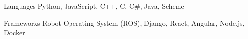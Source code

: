 
\begin{cvskills}
  \cvskill
    {Languages} %
    {Python, JavaScript, C++, C, C\#, Java, Scheme} %

  \cvskill
    {Frameworks} %
    {Robot Operating System (ROS), Django, React, Angular, Node.js, Docker} %
\end{cvskills}
